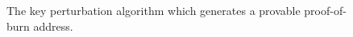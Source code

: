 \begin{figure}[t]
\begin{algorithm}[H]
    \caption{\label{alg.construction-real} The key perturbation algorithm which
    generates a provable proof-of-burn address.}
    \begin{algorithmic}[1]
            \State{}
        \EndFunction
        \vskip8pt
    \end{algorithmic}
\end{algorithm}
\end{figure}

